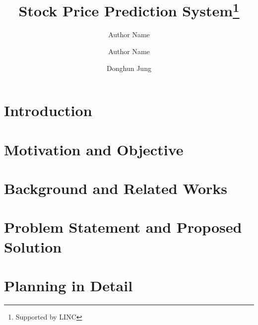 \documentclass[runningheads]{llncs}
\begin{document}
%
\title{Stock Price Prediction System\thanks{Supported by LINC}}
%
%
\author{Author Name \and
Author Name \and
Donghun Jung}
%
%
%
\maketitle              %
%
\begin{abstract}

\end{abstract}
%
%
%
\section{Introduction}
\label{sec:Introduction}


\section{Motivation and Objective}
\label{sec:MotivationAndObjective}


\section{Background and Related Works}
\label{sec:BackgroundAndRelatedWorks}


\section{Problem Statement and Proposed Solution}
\label{sec:ProblemStatementAndProposedSolution}


\section{Planning in Detail}
\label{sec:PlanningInDetail}

\end{document}
